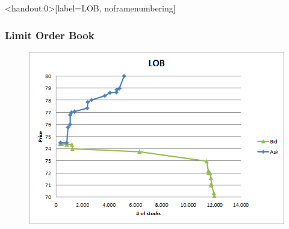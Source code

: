 \documentclass[english,10pt]{beamer}
\theoremstyle{definition}
\begin{document}
\begin{frame}<handout:0>[label=LOB, noframenumbering]
\frametitle{Limit Order Book}
\begin{figure}
\includegraphics[width=.7\paperwidth]{pics/Graph_LOB}
\end{figure}





\hyperlink{main3}{}
\end{frame}
\end{document}
